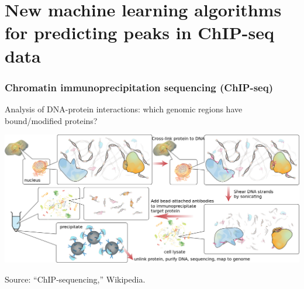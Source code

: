 \documentclass{beamer}
\begin{document}
\section{New machine learning algorithms for predicting peaks in ChIP-seq data}

\begin{frame}
  \frametitle{Chromatin immunoprecipitation sequencing (ChIP-seq)}
  Analysis of DNA-protein interactions: which genomic regions have
  bound/modified proteins?

  \includegraphics[width=\textwidth]{Chromatin_immunoprecipitation_sequencing_wide.png}

  Source: ``ChIP-sequencing,'' Wikipedia.
\end{frame}



\end{document}
